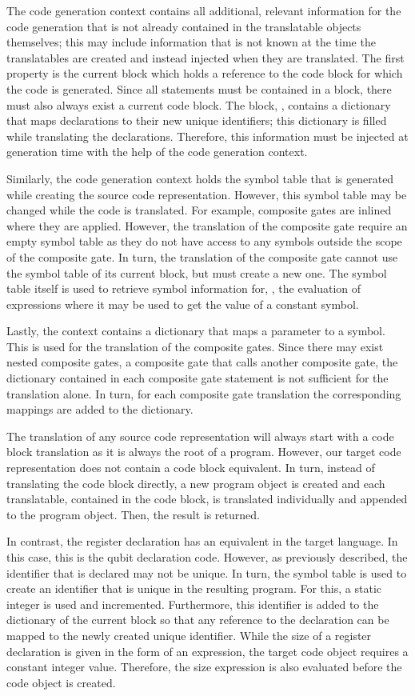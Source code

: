 The code generation context contains all additional, relevant information for the code generation that is not already contained in the translatable objects themselves; this may include information that is not known at the time the translatables are created and instead injected when they are translated. The first property is the current block which holds a reference to the code block for which the code is generated. Since all statements must be contained in a block, there must also always exist a current code block. The block, \eg, contains a dictionary that maps declarations to their new unique identifiers; this dictionary is filled while translating the declarations. Therefore, this information must be injected at generation time with the help of the code generation context. 

Similarly, the code generation context holds the symbol table that is generated while creating the source code representation. However, this symbol table may be changed while the code is translated. For example, composite gates are inlined where they are applied. However, the translation of the composite gate require an empty symbol table as they do not have access to any symbols outside the scope of the composite gate. In turn, the translation of the composite gate cannot use the symbol table of its current block, but must create a new one. The symbol table itself is used to retrieve symbol information for, \eg, the evaluation of expressions where it may be used to get the value of a constant symbol.

Lastly, the context contains a dictionary that maps a parameter to a symbol. This is used for the translation of the composite gates. Since there may exist nested composite gates, \ie a composite gate that calls another composite gate, the dictionary contained in each composite gate statement is not sufficient for the translation alone. In turn, for each composite gate translation the corresponding mappings are added to the dictionary.

The translation of any source code representation will always start with a code block translation as it is always the root of a program. However, our target code representation does not contain a code block equivalent. In turn, instead of translating the code block directly, a new program object is created and each translatable, contained in the code block, is translated individually and appended to the program object. Then, the result is returned.

In contrast, the register declaration has an equivalent in the target language. In this case, this is the qubit declaration code. However, as previously described, the identifier that is declared may not be unique. In turn, the symbol table is used to create an identifier that is unique in the resulting program. For this, a static integer is used and incremented. Furthermore, this identifier is added to the dictionary of the current block so that any reference to the declaration can be mapped to the newly created unique identifier. While the size of a register declaration is given in the form of an expression, the target code object requires a constant integer value. Therefore, the size expression is also evaluated before the code object is created. 

